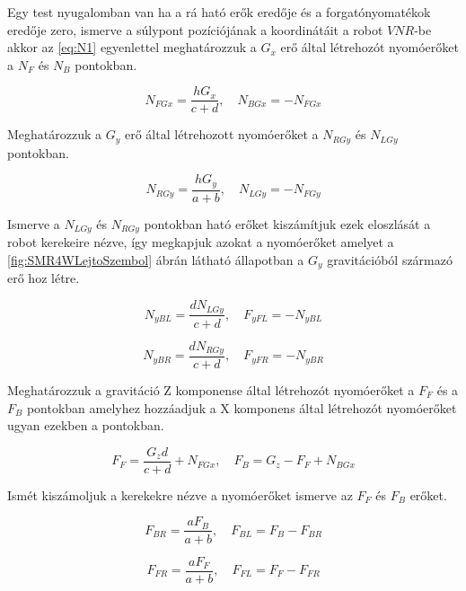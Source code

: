 \fi

Egy test nyugalomban van ha a rá ható erők eredője és a forgatónyomatékok eredője zero, ismerve a súlypont pozíciójának a koordinátáit a robot $VNR$-be akkor az \ref{eq:N1} egyenlettel meghatározzuk a $G_x$ erő által létrehozót nyomóerőket a $N_F$ és $N_B$ pontokban.

\begin{equation}
\label{eq:N1}
    N_{FGx}=\frac{hG_x}{c+d}
    ,\quad
    N_{BGx}= - N_{FGx}
\end{equation}

Meghatározzuk a $G_y$ erő által létrehozott nyomóerőket a $N_{RGy}$ és $N_{LGy}$ pontokban.

\begin{equation}
\label{eq:N2}
    N_{RGy}=\frac{hG_y}{a+b}
    ,\quad
    N_{LGy}= - N_{FGy}
\end{equation}


Ismerve a $N_{LGy}$ és $N_{RGy}$ pontokban ható erőket kiszámítjuk ezek eloszlását a robot kerekeire nézve, így megkapjuk azokat a nyomóerőket amelyet a \ref{fig:SMR4WLejtoSzembol} ábrán látható állapotban a $G_y$ gravitációból származó erő hoz létre.

\begin{equation}
\label{eq:N3}
N_{yBL}=\frac{dN_{LGy}}{c+d}
    ,\quad
F_{yFL}=-N_{yBL}
\end{equation}

\begin{equation}
\label{eq:N4}
N_{yBR}=\frac{dN_{RGy}}{c+d}
    ,\quad
F_{yFR}=-N_{yBR}
\end{equation}


Meghatározzuk a gravitáció Z komponense által létrehozót nyomóerőket a $F_F$ és a $F_B$ pontokban amelyhez hozzáadjuk a X komponens által létrehozót nyomóerőket ugyan ezekben a pontokban.

\begin{equation}
\label{eq:N5}
F_F = \frac{G_zd}{c+d} + N_{FGx}
    ,\quad
F_B = G_z-F_F + N_{BGx}
\end{equation}


Ismét kiszámoljuk a kerekekre nézve a nyomóerőket ismerve az $F_F$ és $F_B$ erőket.

\begin{equation}
\label{eq:N6}
F_{BR}=\frac{aF_B}{a+b}
    ,\quad
F_{BL}=F_{B}-F_{BR}
\end{equation}

\begin{equation}
\label{eq:N7}
F_{FR}=\frac{aF_F}{a+b}
    ,\quad
F_{FL}=F_{F}-F_{FR}
\end{equation}

